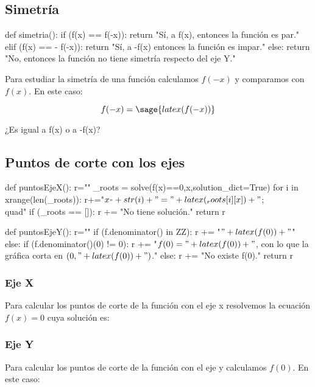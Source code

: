 
\subsection{Simetría}
\begin{sagesilent}
def simetria():
    if (f(x) == f(-x)):
        return "Sí, a f(x), entonces la función es par."
    elif (f(x) == - f(-x)):
        return "Sí, a -f(x) entonces la función es impar."
    else:
        return "No, entonces la función no tiene simetría respecto del eje Y."
\end{sagesilent}

Para estudiar la simetría de una función calculamos $f(-x)$ y comparamos con $f(x)$. 
%
En este caso:

\[f(-x) = \sage{latex(f(-x))}\]

¿Es igual a f(x) o a -f(x)? 

\subsection{Puntos de corte con los ejes}
\begin{sagesilent}
def puntosEjeX():
    r=""
    _roots = solve(f(x)==0,x,solution_dict=True)
    for i in xrange(len(_roots)):
        r+="$x_"+str(i)+" = "+latex(_roots[i][x])+"$;\\quad"
    if (_roots == []):
        r += "No tiene solución."
    return r

def puntosEjeY():
    r=""
    if (f.denominator() in ZZ):
        r += "$" + latex(f(0)) +"$"
    else:
        if (f.denominator()(0) != 0):
            r += "$f(0) = " + latex(f(0)) + "$, con lo que la gráfica corta en $(0,"+latex(f(0)) + ")$."   
        else:
            r +=  "No existe f(0)."    
    return r

\end{sagesilent}

\subsubsection{Eje X}
Para calcular los puntos de corte de la función con el eje x resolvemos la ecuación $f(x) = 0$ cuya solución es: 

\subsubsection{Eje Y}
Para calcular los puntos de corte de la función con el eje y calculamos $f(0)$. 
%
En este caso: 


